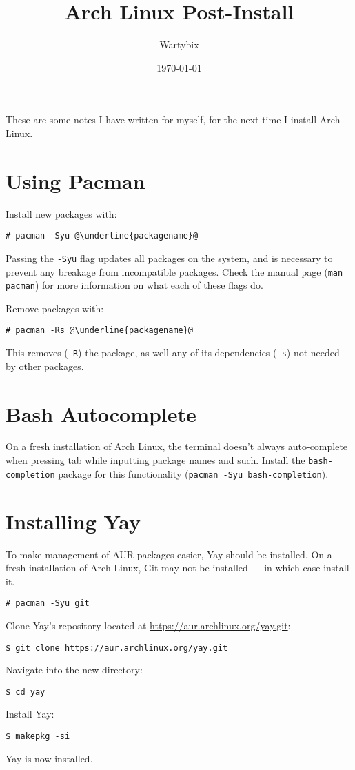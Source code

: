 \documentclass[a4paper]{article}
\title{Arch Linux Post-Install}
\author{Wartybix}
\date{\today}
\begin{document}
\maketitle


These are some notes I have written for myself, for the next time I install Arch Linux.


\section{Using Pacman}

Install new packages with:
\begin{lstlisting}[escapechar=@]
# pacman -Syu @\underline{packagename}@
\end{lstlisting}
Passing the \lstinline|-Syu| flag updates all packages on the system, and is necessary to prevent any breakage from incompatible packages.
Check the manual page (\lstinline|man pacman|) for more information on what each of these 
flags do.

Remove packages with:
\begin{lstlisting}[escapechar=@]
# pacman -Rs @\underline{packagename}@
\end{lstlisting}
This removes (\lstinline|-R|) the package, as well any of its dependencies (\lstinline|-s|) not needed by other packages.


\section{Bash Autocomplete}

On a fresh installation of Arch Linux, the terminal doesn't always auto-complete when pressing tab while inputting package names and such.
Install the \lstinline|bash-completion| package for this functionality (\lstinline|pacman -Syu bash-completion|).


\section{Installing Yay}

To make management of AUR packages easier, Yay should be installed.
On a fresh installation of Arch Linux, Git may not be installed --- in which case install it.
\begin{lstlisting}
# pacman -Syu git
\end{lstlisting}
Clone Yay's repository located at \url{https://aur.archlinux.org/yay.git}:
\begin{lstlisting}
$ git clone https://aur.archlinux.org/yay.git
\end{lstlisting}
Navigate into the new directory:
\begin{lstlisting}
$ cd yay
\end{lstlisting}
Install Yay:
\begin{lstlisting}
$ makepkg -si
\end{lstlisting}
Yay is now installed.
\end{document}

